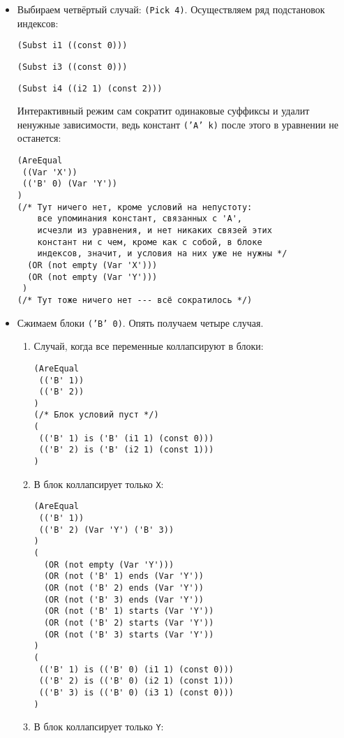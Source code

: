 \documentclass[12pt]{article}
\begin{document}
\begin{itemize}
\begin{enumerate}
\end{enumerate}
\item Выбираем четвёртый случай: \texttt{(Pick 4)}. Осуществляем ряд подстановок индексов: 

\texttt{(Subst i1 ((const 0)))}

\texttt{(Subst i3 ((const 0)))}

\texttt{(Subst i4 ((i2 1) (const 2)))}

Интерактивный режим сам сократит одинаковые суффиксы и удалит ненужные зависимости, ведь констант \texttt{('A' k)} после этого в уравнении не останется:

\begin{verbatim}
(AreEqual 
 ((Var 'X')) 
 (('B' 0) (Var 'Y'))
)
(/* Тут ничего нет, кроме условий на непустоту: 
    все упоминания констант, связанных с 'A', 
    исчезли из уравнения, и нет никаких связей этих 
    констант ни с чем, кроме как с собой, в блоке
    индексов, значит, и условия на них уже не нужны */
  (OR (not empty (Var 'X')))
  (OR (not empty (Var 'Y')))    
 )
(/* Тут тоже ничего нет --- всё сократилось */)
\end{verbatim}
\item Сжимаем блоки \texttt{('B' 0)}. Опять получаем четыре случая.
\begin{enumerate}
\item Случай, когда все переменные коллапсируют в блоки:
\begin{verbatim}
(AreEqual 
 (('B' 1)) 
 (('B' 2))
)
(/* Блок условий пуст */)
( 
 (('B' 1) is ('B' (i1 1) (const 0))) 
 (('B' 2) is ('B' (i2 1) (const 1))) 
)
\end{verbatim}
\item В блок коллапсирует только \verb|X|:
\begin{verbatim}
(AreEqual 
 (('B' 1)) 
 (('B' 2) (Var 'Y') ('B' 3))
)
(
  (OR (not empty (Var 'Y')))
  (OR (not ('B' 1) ends (Var 'Y'))
  (OR (not ('B' 2) ends (Var 'Y'))
  (OR (not ('B' 3) ends (Var 'Y'))
  (OR (not ('B' 1) starts (Var 'Y'))
  (OR (not ('B' 2) starts (Var 'Y'))
  (OR (not ('B' 3) starts (Var 'Y'))
)
( 
 (('B' 1) is (('B' 0) (i1 1) (const 0))) 
 (('B' 2) is (('B' 0) (i2 1) (const 1))) 
 (('B' 3) is (('B' 0) (i3 1) (const 0))) 
)
\end{verbatim}
\item В блок коллапсирует только \verb|Y|:
\begin{verbatim}

\end{verbatim}
\end{enumerate}
\end{itemize}
\end{document}
